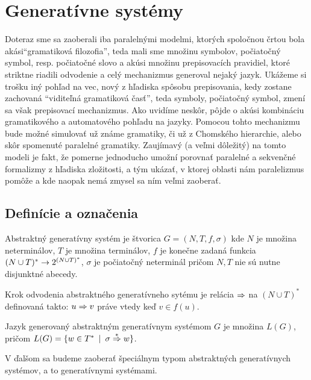 \chapter{Generatívne systémy}

Doteraz sme sa zaoberali iba paralelnými modelmi, ktorých
spoločnou črtou bola akási\linebreak ``gramatiková filozofia'',
teda mali sme množinu symbolov, počiatočný symbol, resp.
počiatočné slovo a akúsi množinu prepisovacích pravidiel, ktoré
striktne riadili odvodenie a celý mechanizmus generoval nejaký
jazyk. Ukážeme si trošku iný pohľad na vec, nový z hľadiska
spôsobu prepisovania, kedy zostane zachovaná ``viditeľná
gramatiková časť'', teda symboly, počiatočný symbol, zmení sa však
prepisovací mechanizmus. Ako uvidíme neskôr, pôjde o akúsi
kombináciu gramatikového a automatového pohľadu na jazyky. Pomocou
tohto mechanizmu bude možné simulovať už známe gramatiky, či už z
Chomského hierarchie, alebo skôr spomenuté paralelné gramatiky.
Zaujímavý (a veľmi dôležitý) na tomto modeli je fakt, že pomerne
jednoducho umožní porovnať paralelné a sekvenčné formalizmy z
hľadiska zložitosti, a tým ukázať, v ktorej oblasti nám
paralelizmus pomôže a kde naopak nemá zmysel sa ním veľmi
zaoberať.

\section{Definície a označenia}

\begin{definicia}
Abstraktný generatívny systém je štvorica $G=(N,T,f,\sigma)$ kde
$N$ je množina neterminálov, $T$ je množina terminálov, $f$ je
konečne zadaná funkcia $(N\cup T)^* \rightarrow 2^{(N\cup T)^* }$,
$\sigma$ je počiatočný neterminál pričom $N,T$ nie sú nutne
disjunktné abecedy.
\end{definicia}

\begin{definicia}
Krok odvodenia abstraktného generatívneho sytému je relácia $\Rightarrow$
na $(N\cup T)^* $ definovaná takto: $u\Rightarrow v$ práve vtedy keď $v\in
f(u)$.
\end{definicia}

\begin{definicia}
Jazyk generovaný abstraktným generatívnym systémom $G$ je množina
$L(G)$, pričom \mbox{$L(G)=\{w\in T^* \enspace |\enspace\sigma\overset{* }{\Rightarrow}
w\}$}.
\end{definicia}

V ďalšom sa budeme zaoberať špeciálnym typom abstraktných
generatívnych systémov, a to generatívnymi systémami.

